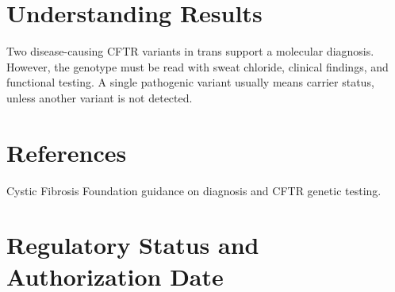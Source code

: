 \section*{Understanding Results}
Two disease-causing CFTR variants in trans support a molecular diagnosis. However, the genotype must be read with sweat chloride, clinical findings, and functional testing. A single pathogenic variant usually means carrier status, unless another variant is not detected.

\section*{References}
Cystic Fibrosis Foundation guidance on diagnosis and CFTR genetic testing.

\clearpage


\section*{Regulatory Status and Authorization Date}

\clearpage
